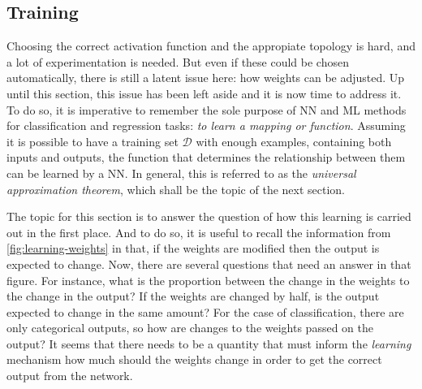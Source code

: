 \subsection{Training}
Choosing the correct activation function and the appropiate topology is hard, and a lot of 
experimentation is needed. But even if these could be chosen automatically, there is still 
a latent issue here: how weights can be adjusted. Up until this section, this issue has 
been left aside and it is now time to address it. To do so, it is imperative to remember 
the sole purpose of NN and ML methods for classification and regression tasks: 
\emph{to learn a mapping or function}. 
Assuming it is possible to have a training set \(\mathcal{D}\) with enough examples, 
containing both inputs and outputs, the function that determines the relationship between 
them can be learned by a NN. In general, this is referred to as the 
\emph{universal approximation theorem}, which shall be the topic of the next section.

The topic for this section is to answer the question of how this learning is carried out in 
the first place. And to do so, it is useful to recall the information from 
\autoref{fig:learning-weights} in that, if the weights are modified then the output is 
expected to change. Now, there are several questions that need an answer in that figure. 
For instance, what is the proportion between the change in the weights to the change in the 
output? If the weights are changed by half, is the output expected to change in the same 
amount? For the case of classification, there are only categorical outputs, so how are 
changes to the weights passed on the output? It seems that there needs to be a quantity 
that must inform the \emph{learning} mechanism how much should the weights change in order 
to get the correct output from the network. 

